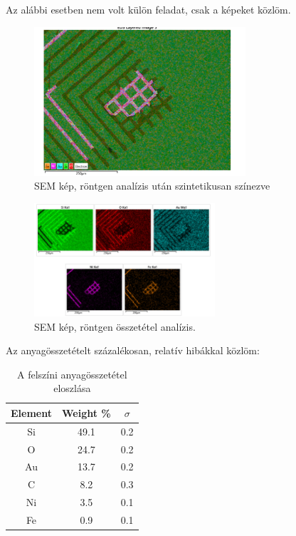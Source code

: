 \documentclass[a4paper,12pt]{article}
\begin{document}
\par Az alábbi esetben nem volt külön feladat, csak a képeket közlöm.

\begin{figure}[H]
	\centering
	\includegraphics[width=0.7\textwidth]{./Jcsop/chip1.png}
	\caption{SEM kép, röntgen analízis után szintetikusan színezve}
\end{figure}

\begin{figure}[H]
	\centering
	\includegraphics[width=0.6\textwidth]{./Jcsop/chip1rtg.png}
	\caption{SEM kép, röntgen összetétel analízis.}
\end{figure}

\par Az anyagösszetételt százalékosan, relatív hibákkal közlöm:

\begin{table}[H]
	\centering
	\begin{tabular}{|c|c|c|} \hline
		Element & Weight \% & $\sigma$ \\  \hline
		Si      & 49.1      & 0.2      \\ \hline
		O       & 24.7      & 0.2      \\ \hline
		Au      & 13.7      & 0.2      \\ \hline
		C       & 8.2       & 0.3      \\ \hline
		Ni      & 3.5       & 0.1      \\ \hline
		Fe      & 0.9       & 0.1      \\ \hline
	\end{tabular}
	\caption{A felszíni anyagösszetétel eloszlása}
\end{table}
\end{document}
